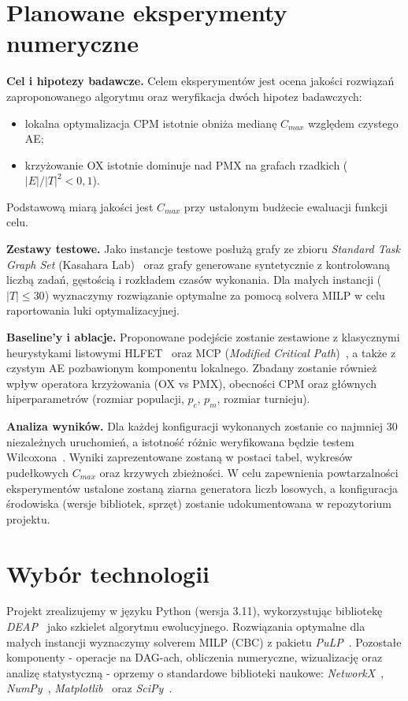\documentclass[12pt,a4paper]{article}
\begin{document}
\section{Planowane eksperymenty numeryczne}
\textbf{Cel i hipotezy badawcze.} Celem eksperymentów jest ocena jakości rozwiązań zaproponowanego algorytmu oraz weryfikacja dwóch hipotez badawczych:
\begin{itemize}[itemsep=1pt, topsep=2pt, leftmargin=3em]
    \item[(H1)] lokalna optymalizacja CPM istotnie obniża medianę $C_{max}$ względem czystego AE;
    \item[(H2)] krzyżowanie OX istotnie dominuje nad PMX na grafach rzadkich ($|E|/|T|^2 < 0{,}1$).
\end{itemize}
Podstawową miarą jakości jest $C_{max}$ przy ustalonym budżecie ewaluacji funkcji celu.
\par\medskip\noindent
\textbf{Zestawy testowe.} Jako instancje testowe posłużą grafy ze zbioru \textit{Standard Task Graph Set} (Kasahara Lab)~\cite{tobita2002} oraz grafy generowane syntetycznie z kontrolowaną liczbą zadań, gęstością i rozkładem czasów wykonania. Dla małych instancji ($|T| \leq 30$) wyznaczymy rozwiązanie optymalne za pomocą solvera MILP w celu raportowania luki optymalizacyjnej.
\par\medskip\noindent
\textbf{Baseline'y i ablacje.} Proponowane podejście zostanie zestawione z klasycznymi heurystykami listowymi HLFET~\cite{adam1974} oraz MCP (\textit{Modified Critical Path})~\cite{wu1990}, a także z czystym AE pozbawionym komponentu lokalnego. Zbadany zostanie również wpływ operatora krzyżowania (OX vs PMX), obecności CPM oraz głównych hiperparametrów (rozmiar populacji, $p_c$, $p_m$, rozmiar turnieju).
\par\medskip\noindent
\textbf{Analiza wyników.} Dla każdej konfiguracji wykonanych zostanie co najmniej 30 niezależnych uruchomień, a istotność różnic weryfikowana będzie testem Wilcoxona~\cite{wilcoxon1945}. Wyniki zaprezentowane zostaną w postaci tabel, wykresów pudełkowych $C_{max}$ oraz krzywych zbieżności. W celu zapewnienia powtarzalności eksperymentów ustalone zostaną ziarna generatora liczb losowych, a konfiguracja środowiska (wersje bibliotek, sprzęt) zostanie udokumentowana w repozytorium projektu.

\section{Wybór technologii}
Projekt zrealizujemy w języku Python (wersja 3.11), wykorzystując bibliotekę \textit{DEAP}~\cite{deap2012} jako szkielet algorytmu ewolucyjnego. Rozwiązania optymalne dla małych instancji wyznaczymy solverem MILP (CBC) z pakietu \textit{PuLP}~\cite{mitchell2011}. Pozostałe komponenty - operacje na DAG-ach, obliczenia numeryczne, wizualizację oraz analizę statystyczną - oprzemy o standardowe biblioteki naukowe: \textit{NetworkX}~\cite{hagberg2008}, \textit{NumPy}~\cite{harris2020}, \textit{Matplotlib}~\cite{hunter2007} oraz \textit{SciPy}~\cite{virtanen2020}.
\end{document}

